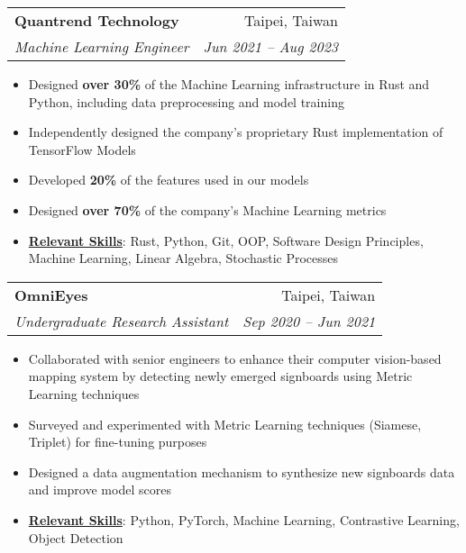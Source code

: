 \documentclass[letterpaper,11pt]{article}
\makeatletter
\newcommand{\resumeItem}[1]{
\item\small{
    {#1 \vspace{-2pt}}
  }
}
\newcommand{\resumeSubheading}[4]{
  \vspace{-2pt}
\item
  \begin{tabular*}{0.97\textwidth}[t]{l@{\extracolsep{\fill}}r}
    \textbf{#1} & #2 \\
    \textit{\small#3} & \textit{\small #4} \\
  \end{tabular*}\vspace{-7pt}
}
\newcommand{\resumeSubSubheading}[2]{
\item
  \begin{tabular*}{0.97\textwidth}{l@{\extracolsep{\fill}}r}
    \textit{\small#1} & \textit{\small #2} \\
  \end{tabular*}\vspace{-7pt}
}
\newcommand{\resumeSubHeadingListEnd}{
  \end{itemize}}
\newcommand{\resumeItemListStart}{
\begin{itemize}}
\newcommand{\resumeItemListEnd}{
  \end{itemize}\vspace{-5pt}}
\makeatother
\begin{document}


\resumeSubheading
{Quantrend Technology}{Taipei, Taiwan}
{Machine Learning Engineer}{Jun 2021 -- Aug 2023}
\resumeItemListStart
\resumeItem{Designed \textbf{over 30\%} of the Machine Learning
  infrastructure in Rust and Python, including data preprocessing and
model training}
\resumeItem{Independently designed the company's proprietary Rust
implementation of TensorFlow Models}
\resumeItem{Developed \textbf{20\%} of the features used in our models}
\resumeItem{Designed \textbf{over 70\%} of the company's Machine
Learning metrics}
\resumeItem{\textbf{\underline{Relevant Skills}}:
  Rust, Python, Git, OOP, Software Design Principles, Machine
  Learning, Linear Algebra, Stochastic Processes
}
\resumeItemListEnd

\resumeSubheading
{OmniEyes}{Taipei, Taiwan}
{Undergraduate Research Assistant}{Sep 2020 -- Jun 2021}
\resumeItemListStart
\resumeItem{Collaborated with senior engineers to enhance their
  computer vision-based mapping system by detecting newly emerged
signboards using Metric Learning techniques}
\resumeItem{Surveyed and experimented with Metric Learning techniques
(Siamese, Triplet) for fine-tuning purposes}
\resumeItem{Designed a data augmentation mechanism to synthesize new
signboards data and improve model scores}
\resumeItem{\textbf{\underline{Relevant Skills}}:
  Python, PyTorch, Machine Learning, Contrastive Learning, Object Detection
}
\resumeItemListEnd
\end{document}
